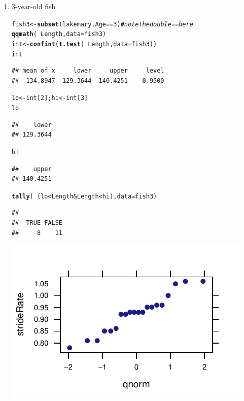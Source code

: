 \documentclass[twoside]{book}\usepackage[]{graphicx}\usepackage[]{xcolor}
\makeatletter
\def\maxwidth{ %
  \ifdim\Gin@nat@width>\linewidth
    \linewidth
  \else
    \Gin@nat@width
  \fi
}
\newcommand{\hlnum}[1]{\textcolor[rgb]{0.686,0.059,0.569}{#1}}%
\newcommand{\hlcom}[1]{\textcolor[rgb]{0.678,0.584,0.686}{\textit{#1}}}%
\newcommand{\hlopt}[1]{\textcolor[rgb]{0,0,0}{#1}}%
\newcommand{\hlstd}[1]{\textcolor[rgb]{0.345,0.345,0.345}{#1}}%
\newcommand{\hlkwb}[1]{\textcolor[rgb]{0.69,0.353,0.396}{#1}}%
\newcommand{\hlkwc}[1]{\textcolor[rgb]{0.333,0.667,0.333}{#1}}%
\newcommand{\hlkwd}[1]{\textcolor[rgb]{0.737,0.353,0.396}{\textbf{#1}}}%
\newenvironment{kframe}{%
 \def\at@end@of@kframe{}%
 \ifinner\ifhmode%
  \def\at@end@of@kframe{\end{minipage}}%
  \begin{minipage}{\columnwidth}%
 \fi\fi%
 \def\FrameCommand##1{\hskip\@totalleftmargin \hskip-\fboxsep
 \colorbox{shadecolor}{##1}\hskip-\fboxsep
     \hskip-\linewidth \hskip-\@totalleftmargin \hskip\columnwidth}%
 \MakeFramed {\advance\hsize-\width
   \@totalleftmargin\z@ \linewidth\hsize
   \@setminipage}}%
 {\par\unskip\endMakeFramed%
 \at@end@of@kframe}
\newenvironment{knitrout}{}{} %
\makeatother
\begin{document}
\begin{solution}
\begin{enumerate}
\item 3-year-old fish
\begin{knitrout}
\color{fgcolor}\begin{kframe}
\begin{alltt}
\hlstd{fish3} \hlkwb{<-} \hlkwd{subset}\hlstd{(lakemary, Age}\hlopt{==}\hlnum{3}\hlstd{)}  \hlcom{# note the double == here}
\hlkwd{qqmath}\hlstd{(}\hlopt{~}\hlstd{Length,} \hlkwc{data}\hlstd{=fish3)}
\hlstd{int} \hlkwb{<-} \hlkwd{confint}\hlstd{(}\hlkwd{t.test}\hlstd{(}\hlopt{~}\hlstd{Length,} \hlkwc{data}\hlstd{=fish3))}
\hlstd{int}
\end{alltt}
\begin{verbatim}
## mean of x     lower     upper     level 
##  134.8947  129.3644  140.4251    0.9500
\end{verbatim}
\begin{alltt}
\hlstd{lo} \hlkwb{<-} \hlstd{int[}\hlnum{2}\hlstd{]; hi} \hlkwb{<-} \hlstd{int[}\hlnum{3}\hlstd{]}
\hlstd{lo}
\end{alltt}
\begin{verbatim}
##    lower 
## 129.3644
\end{verbatim}
\begin{alltt}
\hlstd{hi}
\end{alltt}
\begin{verbatim}
##    upper 
## 140.4251
\end{verbatim}
\begin{alltt}
\hlkwd{tally} \hlstd{(} \hlopt{~} \hlstd{( lo} \hlopt{<} \hlstd{Length} \hlopt{&} \hlstd{Length} \hlopt{<} \hlstd{hi ),} \hlkwc{data}\hlstd{=fish3 )}
\end{alltt}
\begin{verbatim}
## 
##  TRUE FALSE 
##     8    11
\end{verbatim}
\end{kframe}

{\centering \includegraphics[width=\maxwidth]{figures/fig-unnamed-chunk-147-1} 

}
\end{knitrout}
\end{enumerate}
\end{solution}
\end{document}
